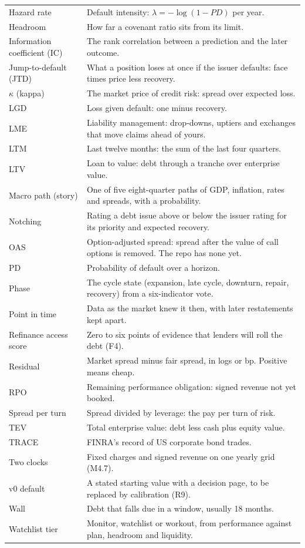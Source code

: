 \documentclass[11pt]{article}
\begin{document}
{\begin{xltabular}{\linewidth}{@{}>{\raggedright\arraybackslash}p{36mm}X@{}}
Hazard rate & Default intensity: $\lambda = -\log(1-PD)$ per year. \\
Headroom & How far a covenant ratio sits from its limit. \\
Information coefficient (IC) & The rank correlation between a prediction and the later outcome. \\
Jump-to-default (JTD) & What a position loses at once if the issuer defaults: face times price less recovery. \\
$\kappa$ (kappa) & The market price of credit risk: spread over expected loss. \\
LGD & Loss given default: one minus recovery. \\
LME & Liability management: drop-downs, uptiers and exchanges that move claims ahead of yours. \\
LTM & Last twelve months: the sum of the last four quarters. \\
LTV & Loan to value: debt through a tranche over enterprise value. \\
Macro path (story) & One of five eight-quarter paths of GDP, inflation, rates and spreads, with a probability. \\
Notching & Rating a debt issue above or below the issuer rating for its priority and expected recovery. \\
OAS & Option-adjusted spread: spread after the value of call options is removed. The repo has none yet. \\
PD & Probability of default over a horizon. \\
Phase & The cycle state (expansion, late cycle, downturn, repair, recovery) from a six-indicator vote. \\
Point in time & Data as the market knew it then, with later restatements kept apart. \\
Refinance access score & Zero to six points of evidence that lenders will roll the debt (F4). \\
Residual & Market spread minus fair spread, in logs or bp. Positive means cheap. \\
RPO & Remaining performance obligation: signed revenue not yet booked. \\
Spread per turn & Spread divided by leverage: the pay per turn of risk. \\
TEV & Total enterprise value: debt less cash plus equity value. \\
TRACE & FINRA's record of US corporate bond trades. \\
Two clocks & Fixed charges and signed revenue on one yearly grid (M4.7). \\
v0 default & A stated starting value with a decision page, to be replaced by calibration (R9). \\
Wall & Debt that falls due in a window, usually 18 months. \\
Watchlist tier & Monitor, watchlist or workout, from performance against plan, headroom and liquidity. \\
\bottomrule
\end{xltabular}
}
\end{document}
